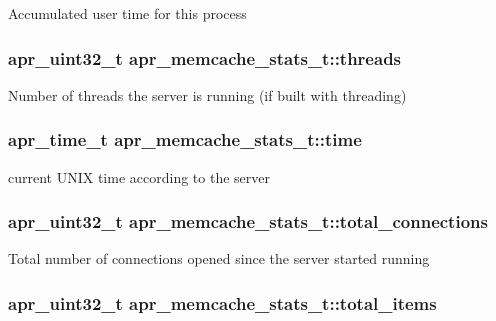 Accumulated user time for this process \hypertarget{structapr__memcache__stats__t_a4e2a4875902e032a56de9ac58315f372}{
\subsubsection[{threads}]{\setlength{\rightskip}{0pt plus 5cm}apr\-\_\-uint32\-\_\-t apr\-\_\-memcache\-\_\-stats\-\_\-t\-::threads}}\label{structapr__memcache__stats__t_a4e2a4875902e032a56de9ac58315f372}
Number of threads the server is running (if built with threading) \hypertarget{structapr__memcache__stats__t_adc02da0e6bfc619cd7eaebfae94404ff}{
\subsubsection[{time}]{\setlength{\rightskip}{0pt plus 5cm}apr\-\_\-time\-\_\-t apr\-\_\-memcache\-\_\-stats\-\_\-t\-::time}}\label{structapr__memcache__stats__t_adc02da0e6bfc619cd7eaebfae94404ff}
current U\-N\-I\-X time according to the server \hypertarget{structapr__memcache__stats__t_a47413a65552fa02fcc8adb74b3d0b8c0}{
\subsubsection[{total\-\_\-connections}]{\setlength{\rightskip}{0pt plus 5cm}apr\-\_\-uint32\-\_\-t apr\-\_\-memcache\-\_\-stats\-\_\-t\-::total\-\_\-connections}}\label{structapr__memcache__stats__t_a47413a65552fa02fcc8adb74b3d0b8c0}
Total number of connections opened since the server started running \hypertarget{structapr__memcache__stats__t_a298fd199bee38cd658d54f6099e9fb58}{
\subsubsection[{total\-\_\-items}]{\setlength{\rightskip}{0pt plus 5cm}apr\-\_\-uint32\-\_\-t apr\-\_\-memcache\-\_\-stats\-\_\-t\-::total\-\_\-items}}\label{structapr__memcache__stats__t_a298fd199bee38cd658d54f6099e9fb58}
